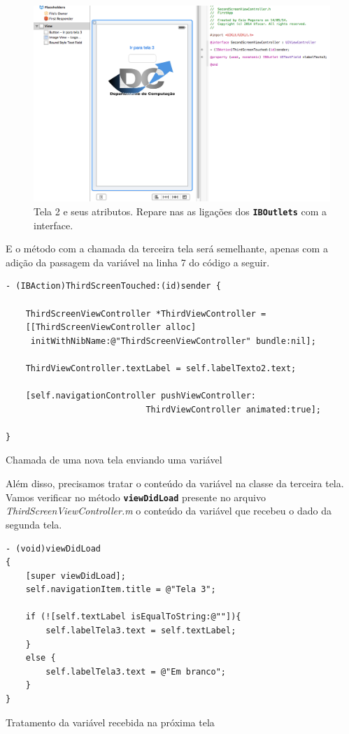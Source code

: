 \documentclass[a4paper,12pt,brazil,oneside]{book}
\begin{document}
\begin{figure}[H]
  \centering
  \includegraphics[width=.99\textwidth]{figuras/3/tela_novo_projeto_44.png}
  \caption{Tela 2 e seus atributos. Repare nas as ligações dos \texttt{\textbf{IBOutlets}} com a interface.}
  \label{fig:a}
\end{figure}

E o método com a chamada da terceira tela será semelhante, apenas com a adição da passagem da variável na linha 7 do código a seguir.

\begin{listing}[H]
\begin{verbatim}
- (IBAction)ThirdScreenTouched:(id)sender {

    ThirdScreenViewController *ThirdViewController =
    [[ThirdScreenViewController alloc]
     initWithNibName:@"ThirdScreenViewController" bundle:nil];
    
    ThirdViewController.textLabel = self.labelTexto2.text;
    
    [self.navigationController pushViewController:
    						ThirdViewController animated:true];
    
}
\end{verbatim}
\caption{Chamada de uma nova tela enviando uma variável}
\end{listing}


Além disso, precisamos tratar o conteúdo da variável na classe da terceira tela. Vamos verificar no método \texttt{\textbf{viewDidLoad}} presente no arquivo \emph{ThirdScreenViewController.m} o conteúdo da variável que recebeu o dado da segunda tela.

\begin{listing}[H]
\begin{verbatim}
- (void)viewDidLoad
{
    [super viewDidLoad];
    self.navigationItem.title = @"Tela 3";
    
    if (![self.textLabel isEqualToString:@""]){
        self.labelTela3.text = self.textLabel;
    }
    else {
        self.labelTela3.text = @"Em branco";
    }
}
\end{verbatim}
\caption{Tratamento da variável recebida na próxima tela}
\end{listing}
\end{document}
